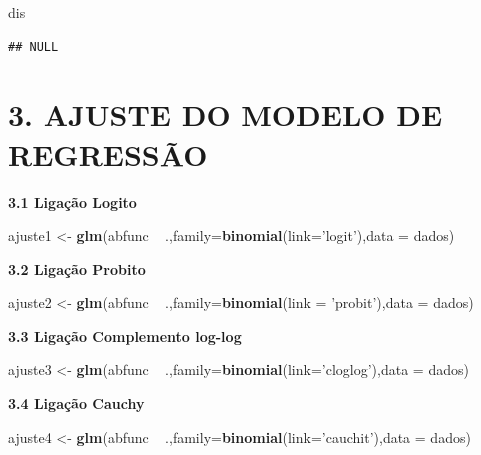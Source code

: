 \documentclass[]{article}
\newenvironment{Shaded}{\begin{snugshade}}{\end{snugshade}}
\newcommand{\KeywordTok}[1]{\textcolor[rgb]{0.13,0.29,0.53}{\textbf{{#1}}}}
\newcommand{\DataTypeTok}[1]{\textcolor[rgb]{0.13,0.29,0.53}{{#1}}}
\newcommand{\StringTok}[1]{\textcolor[rgb]{0.31,0.60,0.02}{{#1}}}
\newcommand{\NormalTok}[1]{{#1}}
\begin{document}
\begin{Shaded}
\begin{Highlighting}[]
\NormalTok{dis}
\end{Highlighting}
\end{Shaded}

\begin{verbatim}
## NULL
\end{verbatim}

\section{3. AJUSTE DO MODELO DE
REGRESSÃO}\label{ajuste-do-modelo-de-regressao}

\textbf{3.1 Ligação Logito}

\begin{Shaded}
\begin{Highlighting}[]
\NormalTok{ajuste1 <-}\StringTok{ }\KeywordTok{glm}\NormalTok{(abfunc ~}\StringTok{ }\NormalTok{.,}\DataTypeTok{family=}\KeywordTok{binomial}\NormalTok{(}\DataTypeTok{link=}\StringTok{'logit'}\NormalTok{),}\DataTypeTok{data =} \NormalTok{dados)}
\end{Highlighting}
\end{Shaded}

\textbf{3.2 Ligação Probito}

\begin{Shaded}
\begin{Highlighting}[]
\NormalTok{ajuste2 <-}\StringTok{ }\KeywordTok{glm}\NormalTok{(abfunc ~}\StringTok{ }\NormalTok{.,}\DataTypeTok{family=}\KeywordTok{binomial}\NormalTok{(}\DataTypeTok{link =} \StringTok{'probit'}\NormalTok{),}\DataTypeTok{data =} \NormalTok{dados)}
\end{Highlighting}
\end{Shaded}

\textbf{3.3 Ligação Complemento log-log}

\begin{Shaded}
\begin{Highlighting}[]
\NormalTok{ajuste3 <-}\StringTok{ }\KeywordTok{glm}\NormalTok{(abfunc ~}\StringTok{ }\NormalTok{.,}\DataTypeTok{family=}\KeywordTok{binomial}\NormalTok{(}\DataTypeTok{link=}\StringTok{'cloglog'}\NormalTok{),}\DataTypeTok{data =} \NormalTok{dados)}
\end{Highlighting}
\end{Shaded}

\textbf{3.4 Ligação Cauchy}

\begin{Shaded}
\begin{Highlighting}[]
\NormalTok{ajuste4 <-}\StringTok{ }\KeywordTok{glm}\NormalTok{(abfunc ~}\StringTok{ }\NormalTok{.,}\DataTypeTok{family=}\KeywordTok{binomial}\NormalTok{(}\DataTypeTok{link=}\StringTok{'cauchit'}\NormalTok{),}\DataTypeTok{data =} \NormalTok{dados)}
\end{Highlighting}
\end{Shaded}
\end{document}
